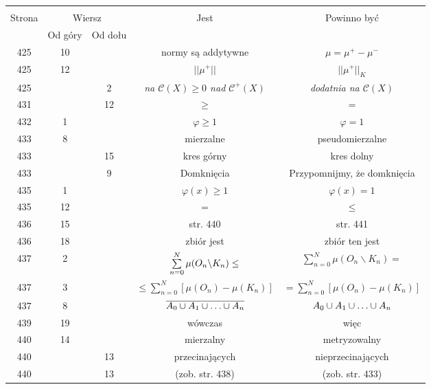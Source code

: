 \documentclass[a4paper,11pt]{article}
\begin{document}
\begin{center}
  \begin{tabular}{|c|c|c|c|c|}
    \hline
    & \multicolumn{2}{c|}{} & & \\
    Strona & \multicolumn{2}{c|}{Wiersz} & Jest
                              & Powinno być \\ \cline{2-3}
    & Od góry & Od dołu & & \\
    \hline
    425 & 10 & & normy są addytywne & $\mu = \mu^{ + } - \mu^{ - }$ \\
    425 & 12 & & $|| \mu^{ + } ||$ & $|| \mu^{ + } ||_{ K }$ \\
    425 & &  2 & \emph{na $\mathcal{C}( X ) \geq 0$ nad
                 $\mathcal{C}^{ + }( X )$}
           & \emph{dodatnia na $\mathcal{C}( X )$} \\
    431 & & 12 & $\geq$ & $=$ \\
    432 &  1 & & $\varphi \geq 1$ & $\varphi = 1$ \\
    433 &  8 & & mierzalne & pseudomierzalne \\
    433 & & 15 & kres górny & kres dolny \\
    433 & &  9 & Domknięcia & Przypomnijmy, że domknięcia \\
    435 &  1 & & $\varphi( x ) \geq 1$ & $\varphi( x ) = 1$ \\
    435 & 12 & & $=$ & $\leq$ \\
    436 & 15 & & str. 440 & str. 441 \\
    436 & 18 & & zbiór jest & zbiór ten jest \\
    437 &  2 & & $\sum\limits^{ N }_{ n = 0 } \mu( O_{ n } \backslash
                 K_{ n } ) \leq$ & $\sum\limits^{ N }_{ n = 0 }
                                   \mu( O_{ n } \backslash K_{ n } ) =$ \\
    437 &  3 & & $\leq \sum\limits^{ N }_{ n = 0 } [ \mu( O_{ n } )
                 - \mu( K_{ n } ) ]$
           & $= \sum\limits^{ N }_{ n = 0 } [ \mu( O_{ n } )
             - \mu( K_{ n } ) ]$ \\
    437 &  8 & & $\overline{ A_{ 0 } \cup A_{ 1 } \cup \ldots \cup A_{ n } }$
           & $A_{ 0 } \cup A_{ 1 } \cup \ldots \cup A_{ n }$ \\
    439 & 19 & & wówczas & więc \\
    440 & 14 & & mierzalny & metryzowalny \\
    440 & & 13 & przecinających & nieprzecinających \\
    440 & & 13 & (zob. str. 438) & (zob. str. 433) \\

\end{tabular}
\end{center}
\end{document}
